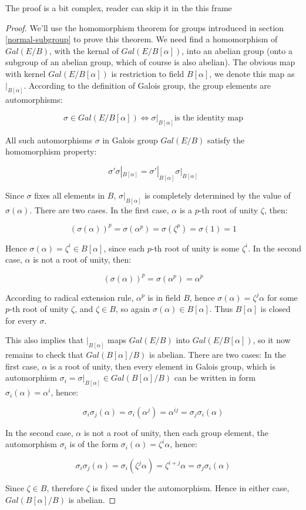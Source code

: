 \documentclass[b5paper]{article}
\begin{document}
\begin{mdframed}
The proof is a bit complex, reader can skip it in the this frame
\begin{proof}
We'll use the homomorphism theorem for groups introduced in section \ref{normal-subgroup} to prove this theorem. We need find a homomorphism of $Gal(E/B)$, with the kernal of $Gal(E/B[\alpha])$, into an abelian group (onto a subgroup of an abelian group, which of course is also abelian). The obvious map with kernel $Gal(E/B[\alpha])$ is restriction to field $B[\alpha]$, we denote this map as $|_{B[\alpha]}$. According to the definition of Galois group, the group elements are automorphisms:

\[
\sigma \in Gal(E/B[\alpha]) \iff \sigma|_{B[\alpha]} \text{is the identity map}
\]

All such automorphisms $\sigma$ in Galois group $Gal(E/B)$ satisfy the homomorphism property:

\[
\sigma'\sigma|_{B[\alpha]} = \sigma'|_{B[\alpha]}\sigma|_{B[\alpha]}
\]

Since $\sigma$ fixes all elements in $B$, $\sigma|_{B[\alpha]}$ is completely determined by the value of $\sigma(\alpha)$. There are two cases. In the first case, $\alpha$ is a $p$-th root of unity $\zeta$, then:

\[
(\sigma(\alpha))^p = \sigma(\alpha^p) = \sigma(\zeta^p) = \sigma(1) = 1
\]

Hence $\sigma(\alpha) = \zeta^i \in B[\alpha]$, since each $p$-th root of unity is some $\zeta^i$. In the second case, $\alpha$ is not a root of unity, then:

\[
(\sigma(\alpha))^p = \sigma(\alpha^p) = \alpha^p
\]

According to radical extension rule, $\alpha^p$ is in field $B$, hence $\sigma(\alpha) = \zeta^j\alpha$ for some $p$-th root of unity $\zeta$, and $\zeta \in B$, so again $\sigma(\alpha) \in B[\alpha]$. Thus $B[\alpha]$ is closed for every $\sigma$.

This also implies that $|_{B[\alpha]}$ maps $Gal(E/B)$ into $Gal(E/B[\alpha])$, so it now remains to check that $Gal(B[\alpha]/B)$ is abelian. There are two cases: In the first case, $\alpha$ is a root of unity, then every element in Galois group, which is automorphism $\sigma_i = \sigma|_{B[\alpha]} \in Gal(B[\alpha]/B)$ can be written in form $\sigma_i(\alpha) = \alpha^i$, hence:

\[
\sigma_i\sigma_j(\alpha) = \sigma_i(\alpha^j) = \alpha^{ij} = \sigma_j\sigma_i(\alpha)
\]

In the second case, $\alpha$ is not a root of unity, then each group element, the automorphism $\sigma_i$ is of the form $\sigma_i(\alpha) = \zeta^i\alpha$, hence:

\[
\sigma_i\sigma_j(\alpha) = \sigma_i(\zeta^j\alpha) = \zeta^{i + j}\alpha = \sigma_j\sigma_i(\alpha)
\]

Since $\zeta \in B$, therefore $\zeta$ is fixed under the automorphism. Hence in either case, $Gal(B[\alpha]/B)$ is abelian.
\end{proof}
\end{mdframed}
\end{document}
